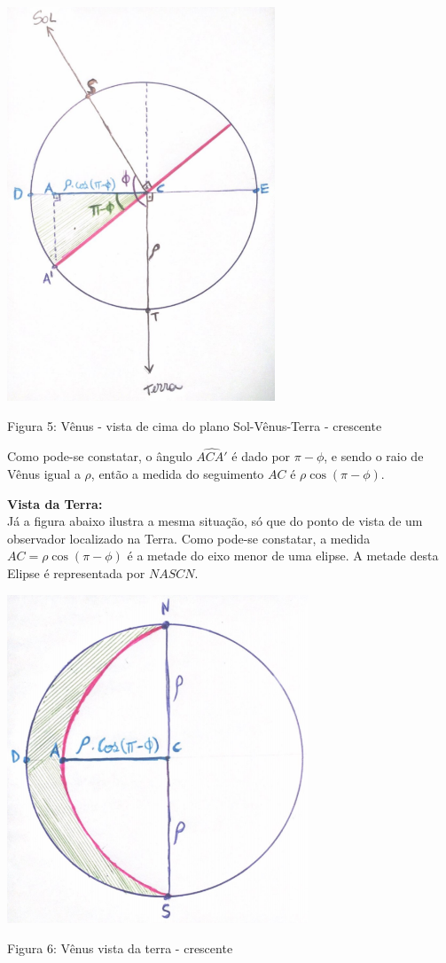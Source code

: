 \documentclass[a4paper, 12pt]{article}
\begin{document}
\begin{center}
    \includegraphics[width=8cm]{05-crescente-de-cima.PNG}
    
    Figura 5: Vênus - vista de cima do plano Sol-Vênus-Terra - crescente
\end{center}

Como pode-se constatar, o ângulo $\hat{ACA'}$ é dado por $\pi-\phi$, e sendo o raio de Vênus igual a $\rho$, então a medida do seguimento $AC$ é $\rho \cos \left(\pi -\phi \right)$.

\textbf{Vista da Terra:}\\
Já a figura abaixo ilustra a mesma situação, só que do ponto de vista de um observador localizado na Terra. 
Como pode-se constatar, a medida $AC=\rho \cos \left(\pi -\phi \right)$ é a metade do eixo menor de uma elipse. A metade desta Elipse é representada por $NASCN$.
\begin{center}
    \includegraphics[width=9cm]{06-crescente-elipse.PNG}
    
    Figura 6: Vênus vista da terra - crescente
\end{center}
\end{document}
